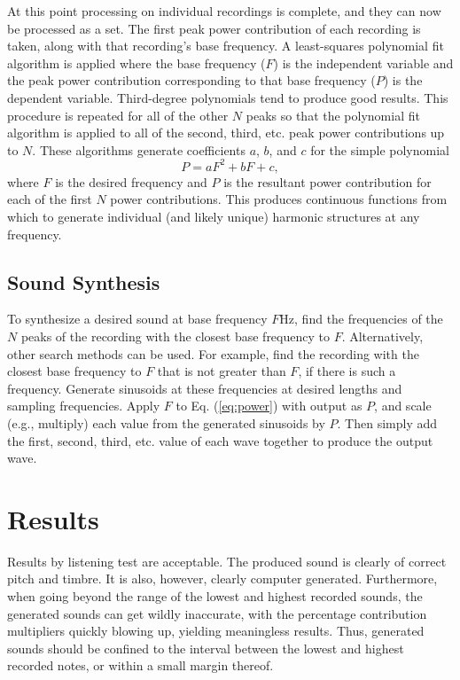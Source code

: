 \documentclass[twocolumn]{article}
\begin{document}
At this point processing on individual recordings is complete, and they can now be processed as a set. The first peak power contribution of each recording is taken, along with that recording's base frequency. A least-squares polynomial fit algorithm is applied where the base frequency ($F$) is the independent variable and the peak power contribution corresponding to that base frequency ($P$) is the dependent variable. Third-degree polynomials tend to produce good results. This procedure is repeated for all of the other $N$ peaks so that the polynomial fit algorithm is applied to all of the second, third, etc. peak power contributions up to $N$. These algorithms generate coefficients $a$, $b$, and $c$ for the simple polynomial \begin{equation} \label{eq:power} P = aF^2 + bF + c,\end{equation} where $F$ is the desired frequency and $P$ is the resultant power contribution for each of the first $N$ power contributions. This produces continuous functions from which to generate individual (and likely unique) harmonic structures at any frequency.

\subsection{Sound Synthesis}

To synthesize a desired sound at base frequency $F$Hz, find the frequencies of the $N$ peaks of the recording with the closest base frequency to $F$. Alternatively, other search methods can be used. For example, find the recording with the closest base frequency to $F$ that is not greater than $F$, if there is such a frequency. Generate sinusoids at these frequencies at desired lengths and sampling frequencies. Apply $F$ to Eq. (\ref{eq:power}) with output as $P$, and scale (e.g., multiply) each value from the generated sinusoids by $P$. Then simply add the first, second, third, etc. value of each wave together to produce the output wave.

\section{Results}

Results by listening test are acceptable. The produced sound is clearly of correct pitch and timbre. It is also, however, clearly computer generated. Furthermore, when going beyond the range of the lowest and highest recorded sounds, the generated sounds can get wildly inaccurate, with the percentage contribution multipliers quickly blowing up, yielding meaningless results. Thus, generated sounds should be confined to the interval between the lowest and highest recorded notes, or within a small margin thereof.
\end{document}
